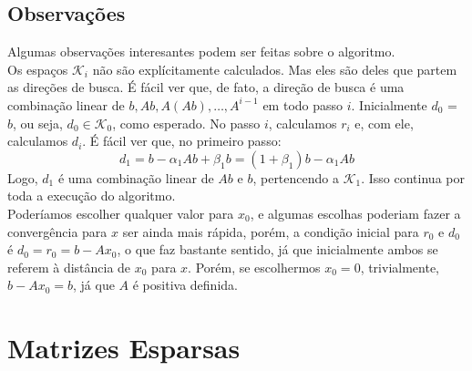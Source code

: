 \documentclass[
10pt, %
a4paper, %
oneside, %
headinclude,footinclude, %
BCOR5mm, %
]{scrartcl}
\begin{document}
\subsection{Observações}
Algumas observações interesantes podem ser feitas sobre o algoritmo. \\
Os espaços $\mathcal{K}_i$ não são explícitamente calculados. Mas eles são deles que partem as direções de busca. É fácil ver que, de fato, a direção de busca é uma combinação linear de $b, Ab, A(Ab), \dots, A^{i-1}$ em todo passo $i$. Inicialmente $d_0$ = $b$, ou seja, $d_0 \in \mathcal{K}_0$, como esperado. No passo $i$, calculamos $r_i$ e, com ele, calculamos $d_i$. É fácil ver que, no primeiro passo:
$$ d_1 = b - \alpha_1 Ab + \beta_1 b = (1+\beta_1)b - \alpha_1 Ab $$
Logo, $d_1$ é uma combinação linear de $Ab$ e $b$, pertencendo a $\mathcal{K}_1$. Isso continua por toda a execução do algoritmo. \\
Poderíamos escolher qualquer valor para $x_0$, e algumas escolhas poderiam fazer a convergência para $x$ ser ainda mais rápida, porém, a condição inicial para $r_0$ e $d_0$ é $d_0 = r_0 = b - Ax_0$, o que faz bastante sentido, já que inicialmente ambos se referem à distância de $x_0$ para $x$. Porém, se escolhermos $x_0 = 0$, trivialmente, $b - Ax_0 = b$, já que $A$ é positiva definida. \\

\section{Matrizes Esparsas}



\renewcommand{\refname}{\spacedlowsmallcaps{Bibliografia}} %


\end{document}
